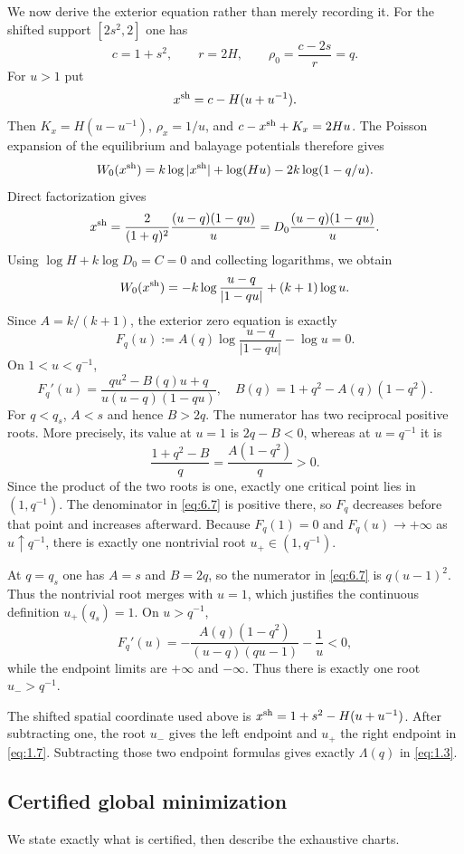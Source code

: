 \documentclass[11pt]{article}
\numberwithin{equation}{section}
\theoremstyle{plain}
\theoremstyle{definition}
\theoremstyle{remark}
\newcommand{\1}{\mathbf 1}
\begin{document}
We now derive the exterior equation rather than merely recording it.  For
the shifted support $[2s^2,2]$ one has
\[
 c=1+s^2,\qquad r=2H,\qquad
 \rho_0=\frac{c-2s}{r}=q.
\]
For $u>1$ put
\[
 x^{\rm sh}=c-H(u+u^{-1}).
\]
Then $K_x=H(u-u^{-1})$, $\rho_x=1/u$, and
$c-x^{\rm sh}+K_x=2Hu$.  The Poisson expansion of the equilibrium and
balayage potentials therefore gives
\[
 W_0(x^{\rm sh})
 =k\log|x^{\rm sh}|+\log(Hu)-2k\log(1-q/u).
\]
Direct factorization gives
\[
 x^{\rm sh}=\frac{2}{(1+q)^2}
 \frac{(u-q)(1-qu)}u=D_0\frac{(u-q)(1-qu)}u.
\]
Using $\log H+k\log D_0=C=0$ and collecting logarithms, we obtain
\[
 W_0(x^{\rm sh})
 =-k\log\frac{u-q}{|1-qu|}+(k+1)\log u.
\]
Since $A=k/(k+1)$, the exterior zero equation is exactly
\[
 F_q(u):=A(q)\log\frac{u-q}{|1-qu|}-\log u=0.
\]
On $1<u<q^{-1}$,
\begin{equation}
 F_q'(u)=\frac{qu^2-B(q)u+q}{u(u-q)(1-qu)},
 \quad B(q)=1+q^2-A(q)(1-q^2).
\label{eq:6.7}
\end{equation}
For $q<q_s$, $A<s$ and hence $B>2q$.  The numerator has two reciprocal
positive roots.  More precisely, its value at $u=1$ is $2q-B<0$, whereas
at $u=q^{-1}$ it is
\[
 \frac{1+q^2-B}{q}=\frac{A(1-q^2)}q>0.
\]
Since the product of the two roots is one, exactly one critical point lies
in $(1,q^{-1})$.  The denominator in \eqref{eq:6.7} is positive there, so
$F_q$ decreases before that point and increases afterward.  Because
$F_q(1)=0$ and $F_q(u)\to+\infty$ as $u\uparrow q^{-1}$, there is exactly
one nontrivial root $u_+\in(1,q^{-1})$.

At $q=q_s$ one has $A=s$ and $B=2q$, so the numerator in \eqref{eq:6.7} is
$q(u-1)^2$.  Thus the nontrivial root merges with $u=1$, which justifies
the continuous definition $u_+(q_s)=1$.  On $u>q^{-1}$,
\[
 F_q'(u)=-\frac{A(q)(1-q^2)}{(u-q)(qu-1)}-\frac1u<0,
\]
while the endpoint limits are $+\infty$ and $-\infty$.  Thus there is
exactly one root $u_->q^{-1}$.

The shifted spatial coordinate used above is
$x^{\rm sh}=1+s^2-H(u+u^{-1})$.  After subtracting one, the root
$u_-$ gives the left endpoint and $u_+$ the right endpoint in \eqref{eq:1.7}.
Subtracting those two endpoint formulas gives exactly $\Lambda(q)$ in
\eqref{eq:1.3}.

\subsection{Certified global minimization}

We state exactly what is certified, then describe the exhaustive charts.
\end{document}

